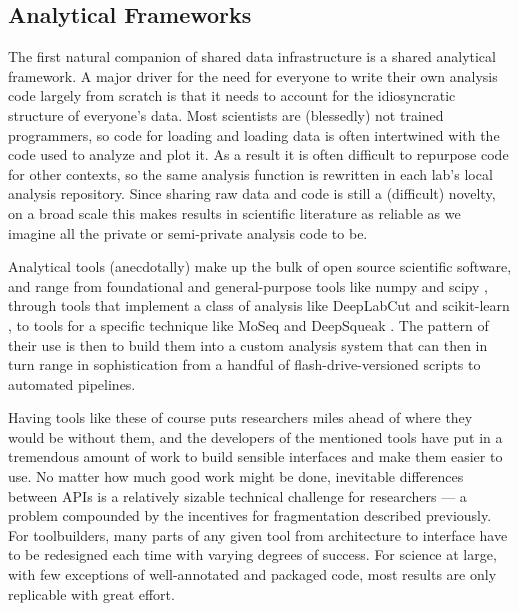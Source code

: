 \hypertarget{analytical-frameworks}{%
\subsection{Analytical Frameworks}\label{analytical-frameworks}}

The first natural companion of shared data infrastructure is a shared
analytical framework. A major driver for the need for everyone to write
their own analysis code largely from scratch is that it needs to account
for the idiosyncratic structure of everyone's data. Most scientists are
(blessedly) not trained programmers, so code for loading and loading
data is often intertwined with the code used to analyze and plot it. As
a result it is often difficult to repurpose code for other contexts, so
the same analysis function is rewritten in each lab's local analysis
repository. Since sharing raw data and code is still a (difficult)
novelty, on a broad scale this makes results in scientific literature as
reliable as we imagine all the private or semi-private analysis code to
be.

Analytical tools (anecdotally) make up the bulk of open source
scientific software, and range from foundational and general-purpose
tools like numpy \citep{harrisArrayProgrammingNumPy2020}  and
scipy \citep{virtanenSciPyFundamentalAlgorithms2020} , through
tools that implement a class of analysis like DeepLabCut \citep{mathisDeepLabCutMarkerlessPose2018}  and scikit-learn \citep{pedregosaScikitlearnMachineLearning2011} , to tools for a specific
technique like MoSeq \citep{wiltschkoRevealingStructurePharmacobehavioral2020}  and DeepSqueak
\citep{coffeyDeepSqueakDeepLearningbased2019} . The pattern of
their use is then to build them into a custom analysis system that can
then in turn range in sophistication from a handful of
flash-drive-versioned scripts to automated pipelines.

Having tools like these of course puts researchers miles ahead of where
they would be without them, and the developers of the mentioned tools
have put in a tremendous amount of work to build sensible interfaces and
make them easier to use. No matter how much good work might be done,
inevitable differences between APIs is a relatively sizable technical
challenge for researchers --- a problem compounded by the incentives for
fragmentation described previously. For toolbuilders, many parts of any
given tool from architecture to interface have to be redesigned each
time with varying degrees of success. For science at large, with few
exceptions of well-annotated and packaged code, most results are only
replicable with great effort.

